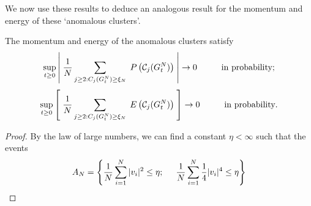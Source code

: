 We now use these results to deduce an analogous result for the momentum and energy of these `anomalous clusters'. \begin{corollary}\label{corr: anomalous clusters 3}  The momentum and energy of the anomalous clusters satisfy \begin{equation}
           \sup_{t\ge 0} \left|\hspace{0.1cm}\frac{1}{N}\sum_{j\ge 2: C_j(G^N_t)\ge \xi_N} \hspace{0.1cm} P\left(\mathcal{C}_j(G^N_t)\right) \hspace{0.1cm}\right| \rightarrow 0 \hspace{1cm} \text{in probability};
       \end{equation} \begin{equation}
           \sup_{t\ge 0} \left[\hspace{0.1cm}\frac{1}{N}\sum_{j\ge 2: C_j(G^N_t)\ge \xi_N} \hspace{0.1cm} E\left(\mathcal{C}_j(G^N_t)\right) \hspace{0.1cm}\right] \rightarrow 0 \hspace{1cm} \text{in probability}.
       \end{equation}   \end{corollary} \begin{proof} By the law of large numbers, we can find a constant $\eta<\infty$ such that the events \begin{equation}
        A_N =\left\{\frac{1}{N}\sum_{i=1}^N |v_i|^2 \le \eta;\hspace{0.5cm} \frac{1}{N}\sum_{i=1}^N \frac{1}{4}|v_i|^4\le \eta\right\}

\end{equation}
\end{proof}
